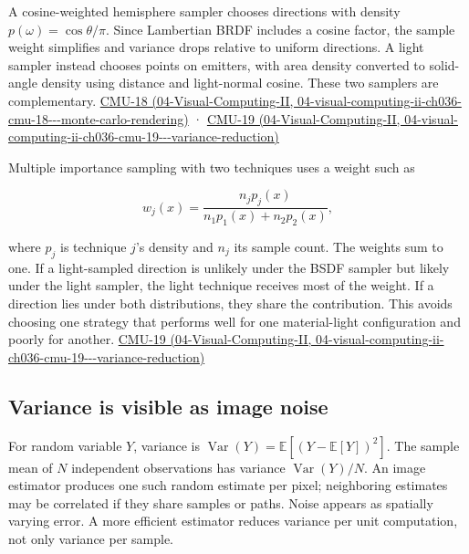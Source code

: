 A cosine-weighted hemisphere sampler chooses directions with density \(p(\omega)=\cos\theta/\pi\). Since Lambertian BRDF includes a cosine factor, the sample weight simplifies and variance drops relative to uniform directions. A light sampler instead chooses points on emitters, with area density converted to solid-angle density using distance and light-normal cosine. These two samplers are complementary. \href{../04-Visual-Computing-II/main.pdf\#nameddest=04-visual-computing-ii-ch036-cmu-18---monte-carlo-rendering}{CMU-18 (04-Visual-Computing-II, 04-visual-computing-ii-ch036-cmu-18-\/-\/-monte-carlo-rendering)} · \href{../04-Visual-Computing-II/main.pdf\#nameddest=04-visual-computing-ii-ch036-cmu-19---variance-reduction}{CMU-19 (04-Visual-Computing-II, 04-visual-computing-ii-ch036-cmu-19-\/-\/-variance-reduction)}

Multiple importance sampling with two techniques uses a weight such as

\[
w_j(x)=\frac{n_jp_j(x)}{n_1p_1(x)+n_2p_2(x)},
\]

where \(p_j\) is technique \(j\)'s density and \(n_j\) its sample count. The weights sum to one. If a light-sampled direction is unlikely under the BSDF sampler but likely under the light sampler, the light technique receives most of the weight. If a direction lies under both distributions, they share the contribution. This avoids choosing one strategy that performs well for one material-light configuration and poorly for another. \href{../04-Visual-Computing-II/main.pdf\#nameddest=04-visual-computing-ii-ch036-cmu-19---variance-reduction}{CMU-19 (04-Visual-Computing-II, 04-visual-computing-ii-ch036-cmu-19-\/-\/-variance-reduction)}

\subsection{Variance is visible as image noise}\label{03-visual-computing-i-ch012-variance-is-visible-as-image-noise}

For random variable \(Y\), variance is \(\operatorname{Var}(Y)=\mathbb E[(Y-\mathbb E[Y])^2]\). The sample mean of \(N\) independent observations has variance \(\operatorname{Var}(Y)/N\). An image estimator produces one such random estimate per pixel; neighboring estimates may be correlated if they share samples or paths. Noise appears as spatially varying error. A more efficient estimator reduces variance per unit computation, not only variance per sample.

